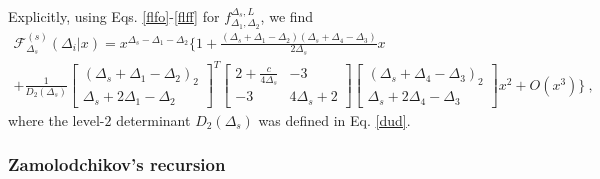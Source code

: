 \documentclass[12pt, a4paper, notitlepage, twoside]{report}
\numberwithin{equation}{section}
\theoremstyle{break}
\begin{document}
Explicitly, using Eqs. \eqref{flfo}-\eqref{flff} for $f_{\Delta_1,\Delta_2}^{\Delta_s,L}$, we find 
\begin{multline}
 \mathcal{F}^{(s)}_{\Delta_s}(\Delta_i|x) 
= x^{\Delta_s - \Delta_1 - \Delta_2}\Bigg\{ 1 
+ \frac{(\Delta_s+\Delta_1-\Delta_2)(\Delta_s+\Delta_4-\Delta_3)}{2\Delta_s} x  
\\
+ \frac{1}{D_2(\Delta_s)}
\begin{bmatrix} (\Delta_s+\Delta_1-\Delta_2)_2 \\ \Delta_s+2\Delta_1-\Delta_2 \end{bmatrix}^T
\begin{bmatrix} 2+\frac{c}{4\Delta_s} & -3 \\ -3 & 4\Delta_s+2 \end{bmatrix}
\begin{bmatrix} (\Delta_s+\Delta_4-\Delta_3)_2 \\ \Delta_s+2\Delta_4-\Delta_3 \end{bmatrix}
 x^2 + O(x^3)\Bigg\}\ ,
 \label{eq:fsexp}
\end{multline}
where the level-$2$ determinant $D_2(\Delta_s)$ was defined in Eq. \eqref{dud}.


\subsubsection{Zamolodchikov's recursion}
\end{document}
